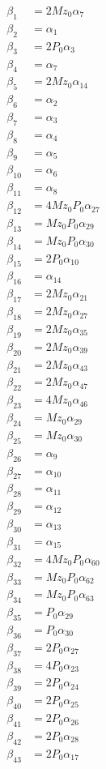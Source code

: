 \documentclass{article}
\begin{document}
\begin{align*}
\beta_{1} &= 2 Mz_{0} \alpha_{7} \\
\beta_{2} &= \alpha_{1} \\
\beta_{3} &= 2 P_{0} \alpha_{3} \\
\beta_{4} &= \alpha_{7} \\
\beta_{5} &= 2 Mz_{0} \alpha_{14} \\
\beta_{6} &= \alpha_{2} \\
\beta_{7} &= \alpha_{3} \\
\beta_{8} &= \alpha_{4} \\
\beta_{9} &= \alpha_{5} \\
\beta_{10} &= \alpha_{6} \\
\beta_{11} &= \alpha_{8} \\
\beta_{12} &= 4 Mz_{0} P_{0} \alpha_{27} \\
\beta_{13} &= Mz_{0} P_{0} \alpha_{29} \\
\beta_{14} &= Mz_{0} P_{0} \alpha_{30} \\
\beta_{15} &= 2 P_{0} \alpha_{10} \\
\beta_{16} &= \alpha_{14} \\
\beta_{17} &= 2 Mz_{0} \alpha_{21} \\
\beta_{18} &= 2 Mz_{0} \alpha_{27} \\
\beta_{19} &= 2 Mz_{0} \alpha_{35} \\
\beta_{20} &= 2 Mz_{0} \alpha_{39} \\
\beta_{21} &= 2 Mz_{0} \alpha_{43} \\
\beta_{22} &= 2 Mz_{0} \alpha_{47} \\
\beta_{23} &= 4 Mz_{0} \alpha_{46} \\
\beta_{24} &= Mz_{0} \alpha_{29} \\
\beta_{25} &= Mz_{0} \alpha_{30} \\
\beta_{26} &= \alpha_{9} \\
\beta_{27} &= \alpha_{10} \\
\beta_{28} &= \alpha_{11} \\
\beta_{29} &= \alpha_{12} \\
\beta_{30} &= \alpha_{13} \\
\beta_{31} &= \alpha_{15} \\
\beta_{32} &= 4 Mz_{0} P_{0} \alpha_{60} \\
\beta_{33} &= Mz_{0} P_{0} \alpha_{62} \\
\beta_{34} &= Mz_{0} P_{0} \alpha_{63} \\
\beta_{35} &= P_{0} \alpha_{29} \\
\beta_{36} &= P_{0} \alpha_{30} \\
\beta_{37} &= 2 P_{0} \alpha_{27} \\
\beta_{38} &= 4 P_{0} \alpha_{23} \\
\beta_{39} &= 2 P_{0} \alpha_{24} \\
\beta_{40} &= 2 P_{0} \alpha_{25} \\
\beta_{41} &= 2 P_{0} \alpha_{26} \\
\beta_{42} &= 2 P_{0} \alpha_{28} \\
\beta_{43} &= 2 P_{0} \alpha_{17} \\
\end{align*}
\end{document}
